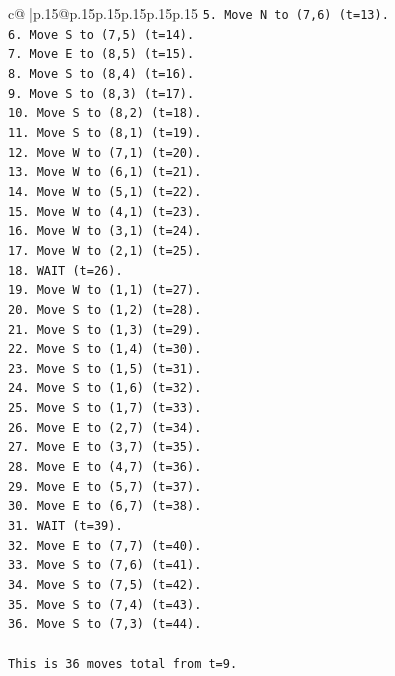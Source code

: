 \documentclass{article}
\begin{document}
{\begin{supertabular}{c@{$\;$}|p{.15\linewidth}@{}p{.15\linewidth}p{.15\linewidth}p{.15\linewidth}p{.15\linewidth}p{.15\linewidth}}
{{{\texttt{5. Move N to (7,6) (t=13).} \\
\texttt{6. Move S to (7,5) (t=14).} \\
\texttt{7. Move E to (8,5) (t=15).} \\
\texttt{8. Move S to (8,4) (t=16).} \\
\texttt{9. Move S to (8,3) (t=17).} \\
\texttt{10. Move S to (8,2) (t=18).} \\
\texttt{11. Move S to (8,1) (t=19).} \\
\texttt{12. Move W to (7,1) (t=20).} \\
\texttt{13. Move W to (6,1) (t=21).} \\
\texttt{14. Move W to (5,1) (t=22).} \\
\texttt{15. Move W to (4,1) (t=23).} \\
\texttt{16. Move W to (3,1) (t=24).} \\
\texttt{17. Move W to (2,1) (t=25).} \\
\texttt{18. WAIT (t=26).} \\
\texttt{19. Move W to (1,1) (t=27).} \\
\texttt{20. Move S to (1,2) (t=28).} \\
\texttt{21. Move S to (1,3) (t=29).} \\
\texttt{22. Move S to (1,4) (t=30).} \\
\texttt{23. Move S to (1,5) (t=31).} \\
\texttt{24. Move S to (1,6) (t=32).} \\
\texttt{25. Move S to (1,7) (t=33).} \\
\texttt{26. Move E to (2,7) (t=34).} \\
\texttt{27. Move E to (3,7) (t=35).} \\
\texttt{28. Move E to (4,7) (t=36).} \\
\texttt{29. Move E to (5,7) (t=37).} \\
\texttt{30. Move E to (6,7) (t=38).} \\
\texttt{31. WAIT (t=39).} \\
\texttt{32. Move E to (7,7) (t=40).} \\
\texttt{33. Move S to (7,6) (t=41).} \\
\texttt{34. Move S to (7,5) (t=42).} \\
\texttt{35. Move S to (7,4) (t=43).} \\
\texttt{36. Move S to (7,3) (t=44).} \\
\\ 
\texttt{This is 36 moves total from t=9.} \\
}}}
\end{supertabular}}
\end{document}

